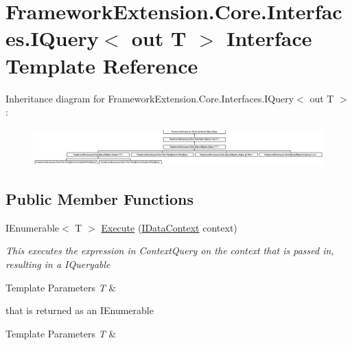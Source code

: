 \hypertarget{interface_framework_extension_1_1_core_1_1_interfaces_1_1_i_query-g}{\section{Framework\-Extension.\-Core.\-Interfaces.\-I\-Query$<$ out T $>$ Interface Template Reference}
\label{interface_framework_extension_1_1_core_1_1_interfaces_1_1_i_query-g}
}
Inheritance diagram for Framework\-Extension.\-Core.\-Interfaces.\-I\-Query$<$ out T $>$\-:\begin{figure}[H]
\begin{center}
\leavevmode
\includegraphics[height=1.435897cm]{interface_framework_extension_1_1_core_1_1_interfaces_1_1_i_query-g}
\end{center}
\end{figure}
\subsection*{Public Member Functions}
\begin{DoxyCompactItemize}
\item 
I\-Enumerable$<$ T $>$ \hyperlink{interface_framework_extension_1_1_core_1_1_interfaces_1_1_i_query-g_aeadee7cdb945427ce105b13caa124969}{Execute} (\hyperlink{interface_framework_extension_1_1_core_1_1_interfaces_1_1_i_data_context}{I\-Data\-Context} context)
\begin{DoxyCompactList}\small\item\em This executes the expression in Context\-Query on the context that is passed in, resulting in a I\-Queryable
\begin{DoxyTemplParams}{Template Parameters}
{\em T} & \\
\hline
\end{DoxyTemplParams}
that is returned as an I\-Enumerable
\begin{DoxyTemplParams}{Template Parameters}
{\em T} & \\
\hline
\end{DoxyTemplParams}
\end{DoxyCompactList}\end{DoxyCompactItemize}


